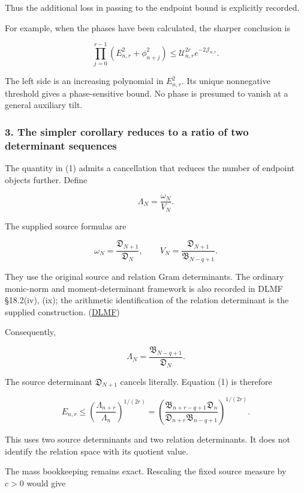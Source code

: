 Thus the additional loss in passing to the endpoint bound is explicitly recorded.

For example, when the phases have been calculated, the sharper conclusion is

\[
\boxed{
\prod_{j=0}^{r-1}
(E_{n,r}^2+\phi_{n+j}^2)
\le
\mathcal U_{n,r}^{2r}e^{-2\mathcal J_{n,r}}.
}
\tag{11}
\]

The left side is an increasing polynomial in \(E_{n,r}^2\). Its unique nonnegative threshold gives a phase-sensitive bound. No phase is presumed to vanish at a general auxiliary tilt.

\subsubsection{3. The simpler corollary reduces to a ratio of two determinant sequences}\label{endpoint-user_product_original--the-simpler-corollary-reduces-to-a-ratio-of-two-determinant-sequences}

The quantity in (1) admits a cancellation that reduces the number of endpoint objects further. Define

\[
\Lambda_N=\frac{\omega_N}{V_N}.
\]

The supplied source formulas are

\[
\omega_N=\frac{\mathfrak D_{N+1}}{\mathfrak D_N},
\qquad
V_N=\frac{\mathfrak D_{N+1}}{\mathfrak B_{N-q+1}}.
\]

They use the original source and relation Gram determinants. The ordinary monic-norm and moment-determinant framework is also recorded in DLMF §18.2(iv), (ix); the arithmetic identification of the relation determinant is the supplied construction. (\href{https://dlmf.nist.gov/18.2?utm_source=chatgpt.com}{DLMF})

Consequently,

\[
\boxed{
\Lambda_N=\frac{\mathfrak B_{N-q+1}}{\mathfrak D_N}.
}
\tag{12}
\]

The source determinant \(\mathfrak D_{N+1}\) cancels literally. Equation (1) is therefore

\[
\boxed{
E_{n,r}
\le
\left(
\frac{\Lambda_{n+r}}{\Lambda_n}
\right)^{1/(2r)}
=
\left(
\frac{
\mathfrak B_{n+r-q+1}\mathfrak D_n
}{
\mathfrak D_{n+r}\mathfrak B_{n-q+1}
}
\right)^{1/(2r)}.
}
\tag{13}
\]

This uses two source determinants and two relation determinants. It does not identify the relation space with its quotient value.

The mass bookkeeping remains exact. Rescaling the fixed source measure by \(c>0\) would give

